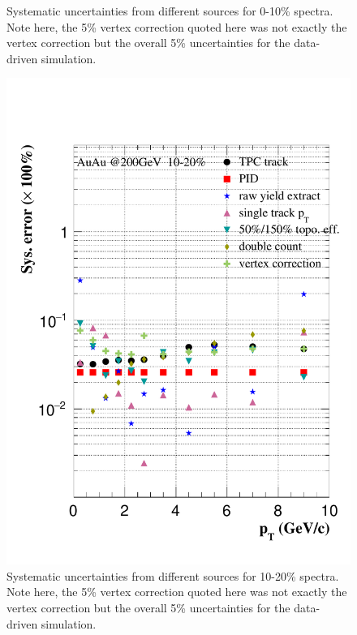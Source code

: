\begin{figure}[htbp]
\begin{minipage}[htbp]{0.47\linewidth}
\caption{ Systematic uncertainties from different sources for 0-10\% spectra. Note here, the 5\% vertex correction quoted here was not exactly the vertex correction but the overall 5\% uncertainties for the data-driven simulation. \label{sysErr_0_10}}
\end{minipage}
\hfill
\begin{minipage}[htbp]{0.47\linewidth}
\centering
\includegraphics[width=1.0\textwidth,angle=0]{figure/Run14_D0HFT/sysErr_10_20_2.pdf} 
\caption{ Systematic uncertainties from different sources for 10-20\% spectra.  Note here, the 5\% vertex correction quoted here was not exactly the vertex correction but the overall 5\% uncertainties for the data-driven simulation.\label{sysErr_10_20}}
\end{minipage}
\end{figure}

